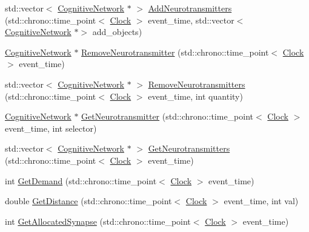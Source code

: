 \begin{DoxyCompactItemize}
\item 
std\+::vector$<$ \mbox{\hyperlink{classCognitiveNetwork}{Cognitive\+Network}} $\ast$ $>$ \mbox{\hyperlink{classSynapse_a5ad01cc92c00d790b44472156065786e}{Add\+Neurotransmitters}} (std\+::chrono\+::time\+\_\+point$<$ \mbox{\hyperlink{universe_8h_a0ef8d951d1ca5ab3cfaf7ab4c7a6fd80}{Clock}} $>$ event\+\_\+time, std\+::vector$<$ \mbox{\hyperlink{classCognitiveNetwork}{Cognitive\+Network}} $\ast$$>$ add\+\_\+objects)
\item 
\mbox{\hyperlink{classCognitiveNetwork}{Cognitive\+Network}} $\ast$ \mbox{\hyperlink{classSynapse_a29593ed2f05d60fcbf1db3e931ef5c53}{Remove\+Neurotransmitter}} (std\+::chrono\+::time\+\_\+point$<$ \mbox{\hyperlink{universe_8h_a0ef8d951d1ca5ab3cfaf7ab4c7a6fd80}{Clock}} $>$ event\+\_\+time)
\item 
std\+::vector$<$ \mbox{\hyperlink{classCognitiveNetwork}{Cognitive\+Network}} $\ast$ $>$ \mbox{\hyperlink{classSynapse_adcf623e56f90e07344537d71c0a5d51b}{Remove\+Neurotransmitters}} (std\+::chrono\+::time\+\_\+point$<$ \mbox{\hyperlink{universe_8h_a0ef8d951d1ca5ab3cfaf7ab4c7a6fd80}{Clock}} $>$ event\+\_\+time, int quantity)
\item 
\mbox{\hyperlink{classCognitiveNetwork}{Cognitive\+Network}} $\ast$ \mbox{\hyperlink{classSynapse_aee76302a55cb0728497caa7a9f5ddeb5}{Get\+Neurotransmitter}} (std\+::chrono\+::time\+\_\+point$<$ \mbox{\hyperlink{universe_8h_a0ef8d951d1ca5ab3cfaf7ab4c7a6fd80}{Clock}} $>$ event\+\_\+time, int selector)
\item 
std\+::vector$<$ \mbox{\hyperlink{classCognitiveNetwork}{Cognitive\+Network}} $\ast$ $>$ \mbox{\hyperlink{classSynapse_a16d2d8025a2955be987731990309316a}{Get\+Neurotransmitters}} (std\+::chrono\+::time\+\_\+point$<$ \mbox{\hyperlink{universe_8h_a0ef8d951d1ca5ab3cfaf7ab4c7a6fd80}{Clock}} $>$ event\+\_\+time)
\item 
int \mbox{\hyperlink{classSynapse_a6d4d63e445961c62f71eaf0da1c2848b}{Get\+Demand}} (std\+::chrono\+::time\+\_\+point$<$ \mbox{\hyperlink{universe_8h_a0ef8d951d1ca5ab3cfaf7ab4c7a6fd80}{Clock}} $>$ event\+\_\+time)
\item 
double \mbox{\hyperlink{classSynapse_a0a0a100802e6662ecf18d39bf2a52d98}{Get\+Distance}} (std\+::chrono\+::time\+\_\+point$<$ \mbox{\hyperlink{universe_8h_a0ef8d951d1ca5ab3cfaf7ab4c7a6fd80}{Clock}} $>$ event\+\_\+time, int val)
\item 
int \mbox{\hyperlink{classSynapse_ad9a7225ede0ce4f64ecea9bc9cb49e20}{Get\+Allocated\+Synapse}} (std\+::chrono\+::time\+\_\+point$<$ \mbox{\hyperlink{universe_8h_a0ef8d951d1ca5ab3cfaf7ab4c7a6fd80}{Clock}} $>$ event\+\_\+time)
$$
\end{DoxyCompactItemize}
